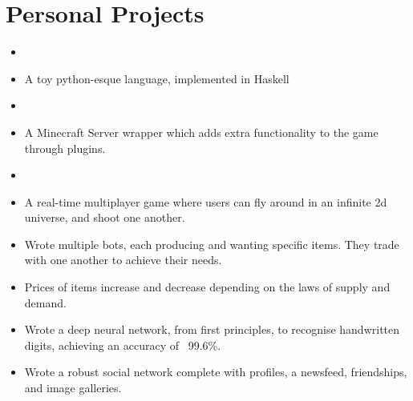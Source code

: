\documentclass{jcgcv}
\begin{document}
\begin{column}



\section{Personal Projects}

\begin{itemize}
  \item {}
  \item A toy python-esque language, implemented in Haskell
\end{itemize}

\begin{itemize}
  \item {}
  \item A Minecraft Server wrapper which adds extra functionality to the game through plugins.
\end{itemize}

\begin{itemize}
  \item {}
  \item A real-time multiplayer game where users can fly around in an infinite 2d universe, and shoot one another.
\end{itemize}

\begin{itemize}
  \item Wrote multiple bots, each producing and wanting specific items. They trade with one another to achieve their needs.
  \item Prices of items increase and decrease depending on the laws of supply and demand.
\end{itemize}

\begin{itemize}
  \item Wrote a deep neural network, from first principles, to recognise handwritten digits, achieving an accuracy of ~99.6\%.
\end{itemize}

\begin{itemize}
  \item Wrote a robust social network complete with profiles, a newsfeed, friendships, and image galleries.
\end{itemize}


\end{column}
\end{document}

